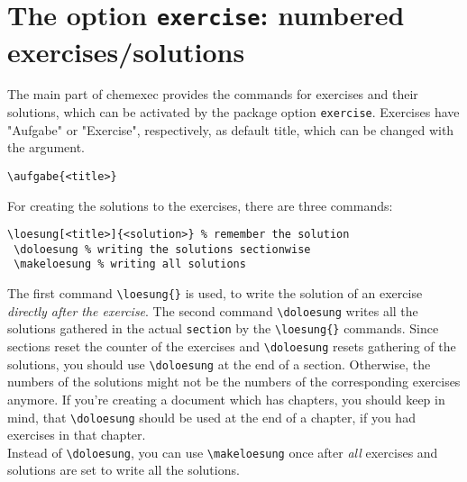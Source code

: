 \documentclass[DIV10]{scrartcl}
\newcommand{\CEx}[1][8]{%
{\color{dunkelrot}\fontfamily{pag}\fontsize{#1}{#1}\selectfont chemexec}\xspace
}
\begin{document}
\section[Exercises/solutions]{The option \texttt{exercise}: numbered exercises/solutions}\label{sec:aufgaben}
The main part of \CEx provides the commands for exercises and their solutions, which can be activated by the package option \verb=exercise=. Exercises have "Aufgabe" or "Exercise", respectively, as default title, which can be changed with the argument.
\begin{lstlisting}[numbers=none,basicstyle=\normalsize\ttfamily]
 \aufgabe{<title>}
\end{lstlisting}
For creating the solutions to the exercises, there are three commands:
\begin{lstlisting}[numbers=none,basicstyle=\normalsize\ttfamily]
 \loesung[<title>]{<solution>} % remember the solution
 \doloesung % writing the solutions sectionwise
 \makeloesung % writing all solutions
\end{lstlisting}
The first command \verb=\loesung{}= is used, to write the solution of an exercise \emph{directly after the exercise}. The second command \verb=\doloesung= writes all the solutions gathered in the actual \verb=section= by the \verb=\loesung{}= commands. Since sections reset the counter of the exercises and \verb=\doloesung= resets gathering of the solutions, you should use \verb=\doloesung= at the end of a section. Otherwise, the numbers of the solutions might not be the numbers of the corresponding exercises anymore. If you're creating a document which has chapters, you should keep in mind, that \verb=\doloesung= should be used at the end of a chapter, if you had exercises in that chapter.\\
Instead of \verb=\doloesung=, you can use \verb=\makeloesung= once after \emph{all} exercises and solutions are set to write all the solutions.
\end{document}

